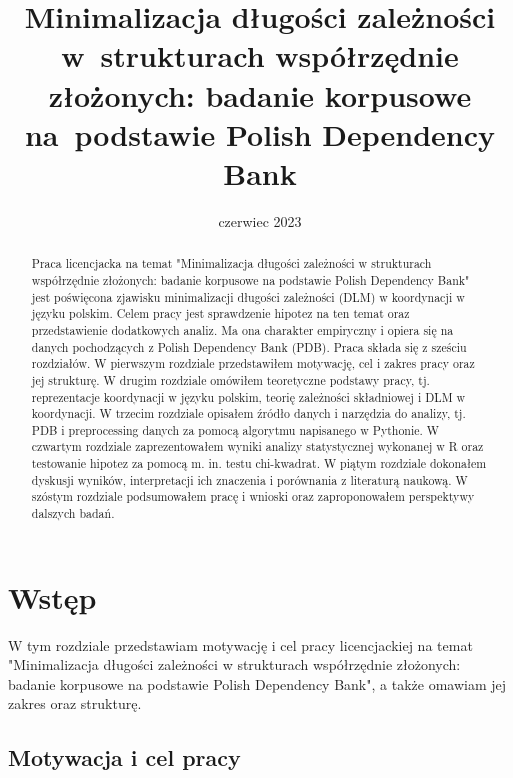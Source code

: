 \documentclass[licencjacka]{pracamgr_Kogni}
\title{Minimalizacja długości zależności w~strukturach współrzędnie złożonych: badanie korpusowe na~podstawie Polish Dependency Bank}
\date{czerwiec 2023}
\begin{document}
\maketitle


\begin{abstract}
Praca licencjacka na temat "Minimalizacja długości zależności w strukturach współrzędnie złożonych: badanie korpusowe na podstawie Polish Dependency Bank"  jest poświęcona zjawisku minimalizacji długości zależności (DLM) w koordynacji w języku polskim. Celem pracy jest sprawdzenie hipotez na ten temat oraz przedstawienie dodatkowych analiz. Ma ona charakter empiryczny i opiera się na danych pochodzących z Polish Dependency Bank (PDB). Praca składa się z sześciu rozdziałów. W pierwszym rozdziale przedstawiłem motywację, cel i zakres pracy oraz jej strukturę. W drugim rozdziale omówiłem teoretyczne podstawy pracy, tj. reprezentacje koordynacji w języku polskim, teorię zależności składniowej i DLM w koordynacji. W trzecim rozdziale opisałem źródło danych i narzędzia do analizy, tj. PDB i preprocessing
danych za pomocą algorytmu napisanego w Pythonie. W czwartym rozdziale zaprezentowałem wyniki analizy statystycznej wykonanej w R oraz testowanie hipotez za pomocą m. in. testu chi-kwadrat. W piątym rozdziale dokonałem dyskusji wyników, interpretacji ich znaczenia i porównania z literaturą naukową. W szóstym rozdziale podsumowałem pracę i wnioski oraz zaproponowałem perspektywy dalszych badań.
\end{abstract}

\thispagestyle{empty}
\setcounter{page}{3}
\tableofcontents 

\chapter{Wstęp}
W tym rozdziale przedstawiam motywację i cel pracy licencjackiej na temat "Minimalizacja długości zależności w strukturach współrzędnie złożonych: badanie korpusowe na podstawie Polish Dependency Bank", a także omawiam jej zakres oraz strukturę.

\section{Motywacja i cel pracy}
\end{document}

